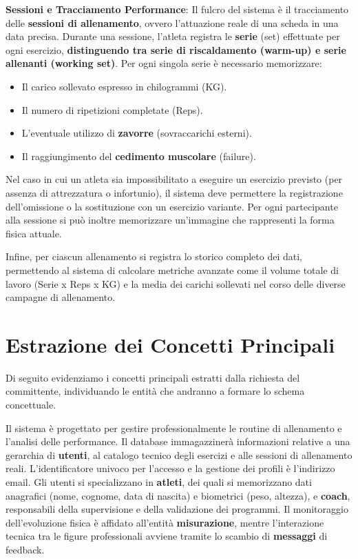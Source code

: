\documentclass[12pt]{report}
\begin{document}
\textbf{Sessioni e Tracciamento Performance}:
Il fulcro del sistema è il tracciamento delle \textbf{sessioni di allenamento}, ovvero l'attuazione reale di una scheda in una data precisa. Durante una sessione, l'atleta registra le \textbf{serie} (set) effettuate per ogni esercizio, \textbf{distinguendo tra serie di riscaldamento (warm-up) e serie allenanti (working set)}. Per ogni singola serie è necessario memorizzare:
\begin{itemize}
    \item Il carico sollevato espresso in chilogrammi (KG).
    \item Il numero di ripetizioni completate (Reps).
    \item L'eventuale utilizzo di \textbf{zavorre} (sovraccarichi esterni).
    \item Il raggiungimento del \textbf{cedimento muscolare} (failure).
\end{itemize}
Nel caso in cui un atleta sia impossibilitato a eseguire un esercizio previsto (per assenza di attrezzatura o infortunio), il sistema deve permettere la registrazione dell'omissione o la sostituzione con un esercizio variante. Per ogni partecipante alla sessione si può inoltre memorizzare un'immagine che rappresenti la forma fisica attuale.

Infine, per ciascun allenamento si registra lo storico completo dei dati, permettendo al sistema di calcolare metriche avanzate come il volume totale di lavoro (Serie x Reps x KG) e la media dei carichi sollevati nel corso delle diverse campagne di allenamento.

\section{Estrazione dei Concetti Principali}
Di seguito evidenziamo i concetti principali estratti dalla richiesta del committente, individuando le entità che andranno a formare lo schema concettuale.

Il sistema è progettato per gestire professionalmente le routine di allenamento e l'analisi delle performance. Il database immagazzinerà informazioni relative a una gerarchia di \textbf{utenti}, al catalogo tecnico degli esercizi e alle sessioni di allenamento reali. L'identificatore univoco per l'accesso e la gestione dei profili è l'indirizzo email. Gli utenti si specializzano in \textbf{atleti}, dei quali si memorizzano dati anagrafici (nome, cognome, data di nascita) e biometrici (peso, altezza), e \textbf{coach}, responsabili della supervisione e della validazione dei programmi. Il monitoraggio dell'evoluzione fisica è affidato all'entità \textbf{misurazione}, mentre l'interazione tecnica tra le figure professionali avviene tramite lo scambio di \textbf{messaggi} di feedback.
\end{document}
